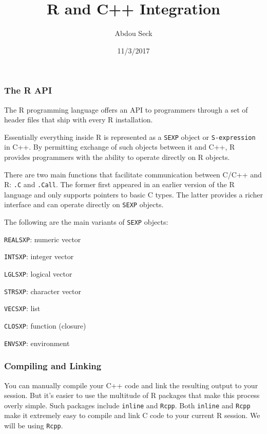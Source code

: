 \documentclass[]{article}
\title{R and C++ Integration}
\author{Abdou Seck}
\date{11/3/2017}
\begin{document}
\maketitle

\subsubsection{The R API}\label{the-r-api}

The R programming language offers an API to programmers through a set of
header files that ship with every R installation.

Essentially everything inside R is represented as a \texttt{SEXP} object
or \texttt{S-expression} in C++. By permitting exchange of such objects
between it and C++, R provides programmers with the ability to operate
directly on R objects.

There are two main functions that facilitate communication between C/C++
and R: \texttt{.C} and \texttt{.Call}. The former first appeared in an
earlier version of the R language and only supports pointers to basic C
types. The latter provides a richer interface and can operate directly
on \texttt{SEXP} objects.

The following are the main variants of \texttt{SEXP} objects:

\texttt{REALSXP}: numeric vector

\texttt{INTSXP}: integer vector

\texttt{LGLSXP}: logical vector

\texttt{STRSXP}: character vector

\texttt{VECSXP}: list

\texttt{CLOSXP}: function (closure)

\texttt{ENVSXP}: environment

\newpage

\subsubsection{Compiling and Linking}\label{compiling-and-linking}

You can manually compile your C++ code and link the resulting output to
your session. But it's easier to use the multitude of R packages that
make this process overly simple. Such packages include \texttt{inline}
and \texttt{Rcpp}. Both \texttt{inline} and \texttt{Rcpp} make it
extremely easy to compile and link C code to your current R session. We
will be using \texttt{Rcpp}.
\end{document}
